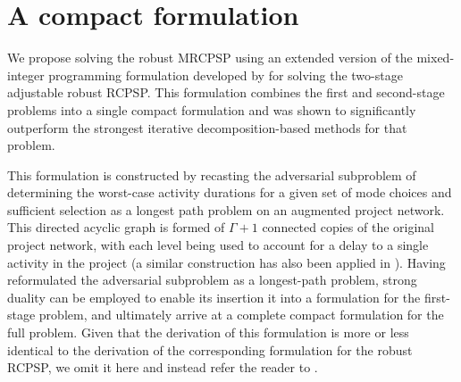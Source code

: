 \documentclass[a4paper,abstracton]{scrartcl}
\begin{document}
\section{A compact formulation}\label{section:compact_formulation}

We propose solving the robust MRCPSP using an extended version of the mixed-integer programming formulation developed by \cite{bold2021compact} for solving the two-stage adjustable robust RCPSP. This formulation combines the first and second-stage problems into a single compact formulation and was shown to significantly outperform the strongest iterative decomposition-based methods for that problem.

This formulation is constructed by recasting the adversarial subproblem of determining the worst-case activity durations for a given set of mode choices and sufficient selection as a longest path problem on an augmented project network. This directed acyclic graph is formed of $\Gamma+1$ connected copies of the original project network, with each level being used to account for a delay to a single activity in the project (a similar construction has also been applied in \cite{bendotti2019anchor}). Having reformulated the adversarial subproblem as a longest-path problem, strong duality can be employed to enable its insertion it into a formulation for the first-stage problem, and ultimately arrive at a complete compact formulation for the full problem. Given that the derivation of this formulation is more or less identical to the derivation of the corresponding formulation for the robust RCPSP, we omit it here and instead refer the reader to \cite{bold2021compact}.
\end{document}
